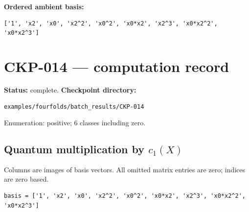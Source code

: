 \documentclass[10pt,a4paper]{article}
\begin{document}
\textbf{Ordered ambient basis:}
\begin{lstlisting}
['1', 'x2', 'x0', 'x2^2', 'x0^2', 'x0*x2', 'x2^3', 'x0*x2^2', 'x0*x2^3']
\end{lstlisting}

\clearpage\section*{CKP-014 --- computation record}
\textbf{Status:} complete.
\textbf{Checkpoint directory:}
\begin{lstlisting}
examples/fourfolds/batch_results/CKP-014
\end{lstlisting}

Enumeration: positive; 6 classes including zero.
\subsection*{Quantum multiplication by $c_1(X)$}
Columns are images of basis vectors. All omitted matrix entries are zero; indices are zero based.

\begin{lstlisting}
basis = ['1', 'x2', 'x0', 'x2^2', 'x0^2', 'x0*x2', 'x2^3', 'x0*x2^2', 'x0*x2^3']
\end{lstlisting}
\end{document}
